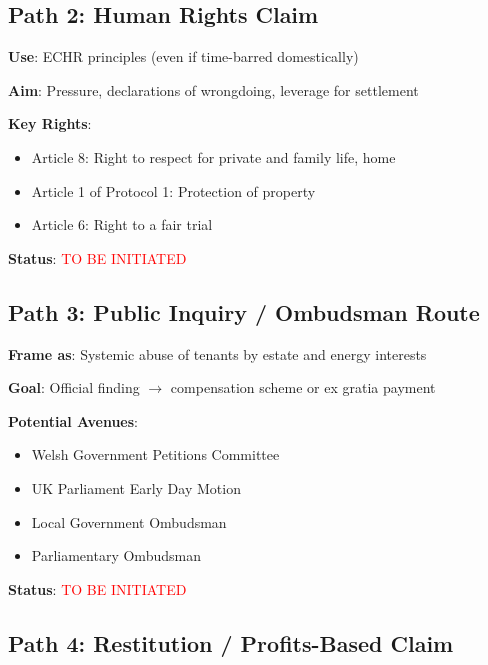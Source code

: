 \documentclass[11pt,a4paper]{article}
\begin{document}
\subsection{Path 2: Human Rights Claim}

\begin{action}
\textbf{Use}: ECHR principles (even if time-barred domestically)

\textbf{Aim}: Pressure, declarations of wrongdoing, leverage for settlement

\textbf{Key Rights}:
\begin{itemize}
    \item Article 8: Right to respect for private and family life, home
    \item Article 1 of Protocol 1: Protection of property
    \item Article 6: Right to a fair trial
\end{itemize}

\textbf{Status}: \textcolor{red}{TO BE INITIATED}
\end{action}

\subsection{Path 3: Public Inquiry / Ombudsman Route}

\begin{action}
\textbf{Frame as}: Systemic abuse of tenants by estate and energy interests

\textbf{Goal}: Official finding $\rightarrow$ compensation scheme or ex gratia payment

\textbf{Potential Avenues}:
\begin{itemize}
    \item Welsh Government Petitions Committee
    \item UK Parliament Early Day Motion
    \item Local Government Ombudsman
    \item Parliamentary Ombudsman
\end{itemize}

\textbf{Status}: \textcolor{red}{TO BE INITIATED}
\end{action}

\subsection{Path 4: Restitution / Profits-Based Claim}
\end{document}
